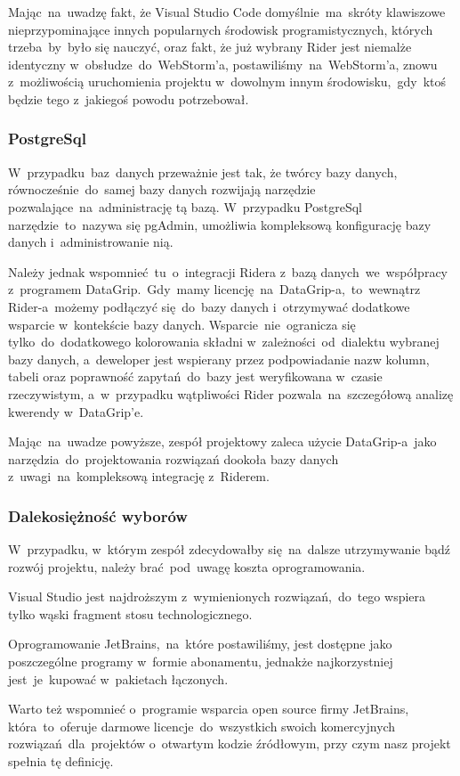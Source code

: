 Mając~na~uwadzę fakt, że Visual Studio Code domyślnie~ma~skróty klawiszowe nieprzypominające innych popularnych środowisk programistycznych, których trzeba~by~było się nauczyć, oraz fakt, że już wybrany Rider jest niemalże identyczny w~obsłudze~do~WebStorm'a, postawiliśmy~na~WebStorm'a, znowu z~możliwością uruchomienia projektu w~dowolnym innym środowisku,~gdy~ktoś będzie tego z~jakiegoś powodu potrzebował.

\subsubsection{PostgreSql}
\indent W~przypadku~baz~danych przeważnie jest tak, że twórcy bazy danych, równocześnie~do~samej bazy danych rozwijają narzędzie pozwalające~na~administrację tą bazą.
W~przypadku PostgreSql narzędzie~to~nazywa się pgAdmin, umożliwia kompleksową konfigurację bazy danych i~administrowanie nią.

Należy jednak wspomnieć~tu~o~integracji Ridera z~bazą danych~we~współpracy z~programem DataGrip.~Gdy~mamy licencję~na~DataGrip-a,~to~wewnątrz Rider-a~możemy podłączyć się~do~bazy danych i~otrzymywać dodatkowe wsparcie w~kontekście bazy danych.
Wsparcie~nie~ogranicza się tylko~do~dodatkowego kolorowania składni w~zależności~od~dialektu wybranej bazy danych, a~deweloper jest wspierany przez podpowiadanie nazw kolumn, tabeli oraz poprawność zapytań~do~bazy jest  weryfikowana w~czasie rzeczywistym, a~w~przypadku wątpliwości Rider pozwala~na~szczegółową analizę kwerendy w~DataGrip'e.

Mając~na~uwadze powyższe, zespół projektowy zaleca użycie DataGrip-a~jako narzędzia~do~projektowania rozwiązań dookoła bazy danych z~uwagi~na~kompleksową integrację z~Riderem.

\subsubsection{Dalekosiężność wyborów}
\indent W~przypadku, w~którym zespół zdecydowałby się~na~dalsze utrzymywanie bądź rozwój projektu, należy brać~pod~uwagę koszta oprogramowania.

Visual Studio jest najdroższym z~wymienionych rozwiązań,~do~tego wspiera tylko wąski fragment stosu technologicznego.

Oprogramowanie JetBrains,~na~które postawiliśmy, jest dostępne jako poszczególne programy w~formie abonamentu, jednakże najkorzystniej jest~je~kupować w~pakietach łączonych.

Warto też wspomnieć o~programie wsparcia open source firmy JetBrains, która~to~oferuje darmowe licencje~do~wszystkich swoich komercyjnych rozwiązań~dla~projektów o~otwartym kodzie źródłowym, przy czym nasz projekt spełnia tę definicję.

